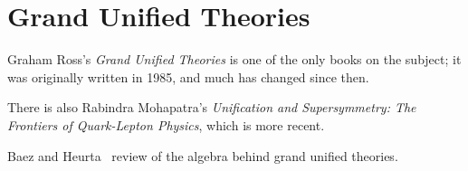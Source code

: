 \chapter{Grand Unified Theories}

\M
Graham Ross's \textit{Grand Unified Theories} is one of the only books
on the subject; it was originally written in 1985, and much has changed
since then.

There is also Rabindra Mohapatra's \textit{Unification and Supersymmetry: The Frontiers of Quark-Lepton Physics},
which is more recent.

Baez and Heurta~\cite{Baez:2009dj} review of the algebra behind grand
unified theories.
